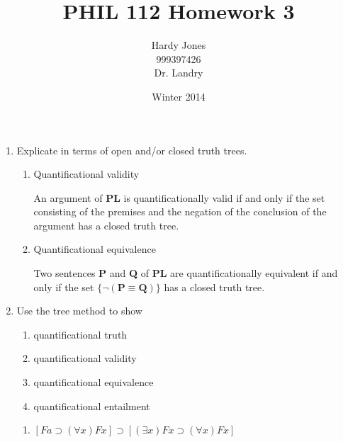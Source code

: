 \documentclass[12pt,letterpaper]{article}
\title{PHIL 112 Homework 3\vspace{-2ex}}
\author{Hardy Jones\\
        999397426\\
        Dr. Landry\vspace{-2ex}}
\date{Winter 2014}
\begin{document}
  \maketitle

  \begin{enumerate}
    \item Explicate in terms of open and/or closed truth trees.
      \begin{enumerate}
        \item Quantificational validity

          An argument of \textbf{PL} is quantificationally valid if and only if
          the set consisting of the premises and the negation of the conclusion
          of the argument has a closed truth tree.

        \item Quantificational equivalence

          Two sentences \textbf{P} and \textbf{Q} of \textbf{PL}
          are quantificationally equivalent if and only if
          the set $\{\neg (\mathbf{P} \equiv \mathbf{Q})\}$ has a closed truth tree.
      \end{enumerate}
    \item
      Use the tree method to show
      \begin{enumerate}
        \item quantificational truth
        \item quantificational validity
        \item quantificational equivalence
        \item quantificational entailment
      \end{enumerate}
      \begin{enumerate}
        \item
          $[Fa \supset (\forall x)Fx] \supset [(\exists x)Fx \supset (\forall x) Fx]$



\end{enumerate}
\end{enumerate}
\end{document}
